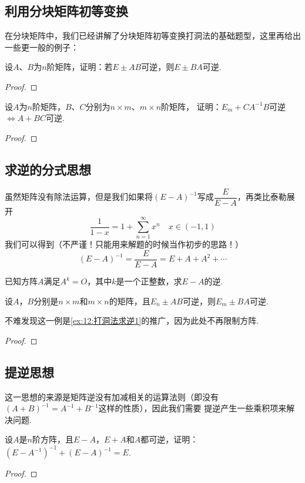 \subsection{利用分块矩阵初等变换}
在分块矩阵中，我们已经讲解了分块矩阵初等变换打洞法的基础题型，这里再给出一些更一般的例子：
\begin{example}\label{ex:12:打洞法求逆1}
    设$A$、$B$为$n$阶矩阵，证明：若$E\pm AB$可逆，则$E\pm BA$可逆.
\end{example}
\begin{proof}
    
\end{proof}

\begin{example}
    设$A$为$n$阶矩阵，$B$、$C$分别为$n \times m$、$m \times n$阶矩阵，
    证明：$E_m+CA^{-1}B$可逆$\iff A+BC$可逆.
\end{example}
\begin{proof}
    
\end{proof}

\subsection{求逆的分式思想}
虽然矩阵没有除法运算，但是我们如果将$(E-A)^{-1}$写成$\dfrac{E}{E-A}$，再类比泰勒展开
\[\frac{1}{1-x}=1+\sum_{n=1}^\infty x^n \quad x\in (-1,1)\]我们可以得到（不严谨！只能用来解题的时候当作初步的思路！）
\[(E-A)^{-1}=\frac{E}{E-A}=E+A+A^2+\cdots\]

\begin{example}
    已知方阵$A$满足$A^k=O$，其中$k$是一个正整数，求$E-A$的逆.
\end{example}
\begin{solution}

\end{solution}

\begin{example}
    设$A$，$B$分别是$n \times m$和$m \times n$的矩阵，且$E_n \pm AB$可逆，则$E_m \pm BA$可逆.
\end{example}
不难发现这一例是\autoref{ex:12:打洞法求逆1}的推广，因为此处不再限制方阵.

\begin{proof}
    
\end{proof}

\subsection{提逆思想}
这一思想的来源是矩阵逆没有加减相关的运算法则（即没有$(A+B)^{-1}=A^{-1}+B^{-1}$这样的性质），因此我们需要
提逆产生一些乘积项来解决问题.
\begin{example}
    设$A$是$n$阶方阵，且$E-A$，$E+A$和$A$都可逆，证明：$(E-A^{-1})^{-1}+(E-A)^{-1}=E$.
\end{example}
\begin{proof}
    
\end{proof}

